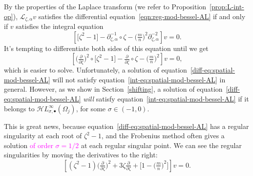 \documentclass{article}
\newcommand{\singexp}[2]{\mathcal{H}L^\infty_{#1, #2}}
\newcommand{\singexpalg}[1]{\singexp{#1}{\bullet}}
\newcommand{\fracderiv}[3]{\partial^{#1}_{#2, #3}}
\newcommand{\laplace}{\mathcal{L}}
\theoremstyle{definition}
\theoremstyle{plain}
\begin{document}
By the properties of the Laplace transform (we refer to Proposition~\ref{prop:L-int-op}), $\laplace_{\zeta, \alpha} v$ satisfies the differential equation~\eqref{eqn:reg-mod-bessel-AL} if and only if $v$ satisfies the integral equation
\begin{equation}\label{int-eq:spatial-mod-bessel-AL}
\left[ \big[ \zeta^2 - 1 \big] - \fracderiv{-1}{\zeta}{\alpha} \circ \zeta - \big(\tfrac{m}{n}\big)^2 \fracderiv{-2}{\zeta}{\alpha} \right] v = 0.
\end{equation}
It's tempting to differentiate both sides of this equation until we get
\begin{equation}\label{diff-eq:spatial-mod-bessel-AL}
\left[ \big(\tfrac{\partial}{\partial \zeta}\big)^2 \circ \big[ \zeta^2 - 1 \big] - \tfrac{\partial}{\partial \zeta} \circ \zeta - \big(\tfrac{m}{n}\big)^2 \right] v = 0,
\end{equation}
which is easier to solve. Unfortunately, a solution of equation~\eqref{diff-eq:spatial-mod-bessel-AL} will not satisfy equation~\eqref{int-eq:spatial-mod-bessel-AL} in general. However, as we show in Section~\ref{shifting}, a solution of equation~\eqref{diff-eq:spatial-mod-bessel-AL} {\em will} satisfy equation~\eqref{int-eq:spatial-mod-bessel-AL} if it belongs to $\singexpalg{\sigma}(\Omega_j)$, for some $\sigma\in (-1, 0)$.

This is great news, because equation~\eqref{diff-eq:spatial-mod-bessel-AL} has a regular singularity at each root of $\zeta^2 - 1$, and the Frobenius method often gives a solution \textcolor{magenta}{of order $\sigma=1/2$} at each regular singular point. We can see the regular singularities by moving the derivatives to the right:
\[ \left[ (\zeta^2 - 1) \big(\tfrac{\partial}{\partial \zeta}\big)^2 + 3\zeta \tfrac{\partial}{\partial \zeta} + \big[ 1 - \big(\tfrac{m}{n}\big)^2 \big] \right] v = 0. \]
\end{document}
